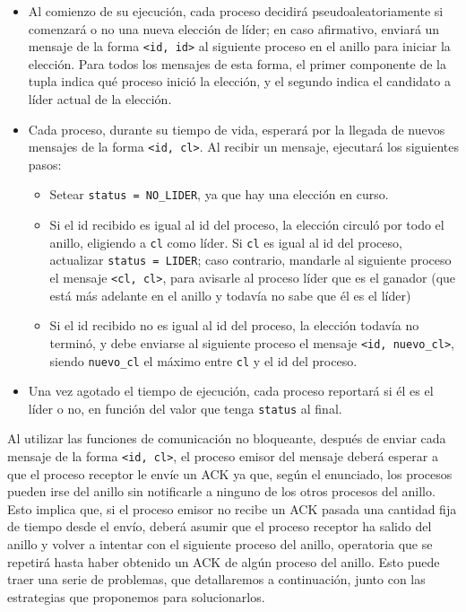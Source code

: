 \begin{itemize}

    \item Al comienzo de su ejecución, cada proceso decidirá
    pseudoaleatoriamente si comenzará o no una nueva
    elección de líder; en caso afirmativo, enviará un mensaje de la forma
    \verb|<id, id>| al siguiente proceso en el anillo para iniciar la elección.
    Para todos los mensajes de esta forma, el primer componente de la tupla 
    indica qué proceso inició la elección, y el segundo indica el candidato
    a líder actual de la elección.

    \item Cada proceso, durante su tiempo de vida, esperará por la
    llegada de nuevos mensajes de la forma \verb|<id, cl>|. Al recibir un 
    mensaje, ejecutará los siguientes pasos:

    \begin{itemize}

        \item Setear \verb|status = NO_LIDER|, ya que hay una elección
        en curso.

        \item Si el id recibido es igual al id del proceso, la elección 
        circuló por todo el anillo, eligiendo a \verb|cl| como líder.
        Si \verb|cl| es igual al id del proceso, actualizar
        \verb|status = LIDER|; caso contrario, mandarle al siguiente proceso
        el mensaje \verb|<cl, cl>|, para avisarle al proceso líder que es el
        ganador (que está más adelante en el anillo y todavía no sabe que él
        es el líder)

        \item Si el id recibido no es igual al id del proceso, la elección
        todavía no terminó, y debe enviarse al siguiente proceso el mensaje
        \verb|<id, nuevo_cl>|, siendo \verb|nuevo_cl| el máximo entre \verb|cl|
        y el id del proceso.

    \end{itemize}
    
    \item Una vez agotado el tiempo de ejecución, cada proceso reportará si él
    es el líder o no, en función del valor que tenga \verb|status| al final.

\end{itemize}

Al utilizar las funciones de comunicación no bloqueante, después de enviar cada
mensaje de la forma \verb|<id, cl>|, el proceso emisor del mensaje deberá
esperar a que el proceso receptor le envíe un ACK ya que, según el enunciado,
los procesos pueden irse del anillo sin notificarle a ninguno de los otros
procesos del anillo. Esto implica que, si el proceso emisor no recibe un ACK
pasada una cantidad fija de tiempo desde el envío, deberá asumir que el proceso
receptor ha salido del anillo y volver a intentar con el siguiente proceso del
anillo, operatoria que se repetirá hasta haber obtenido un ACK de algún proceso
del anillo. Esto puede traer una serie de problemas, que detallaremos a
continuación, junto con las estrategias que proponemos para solucionarlos.

